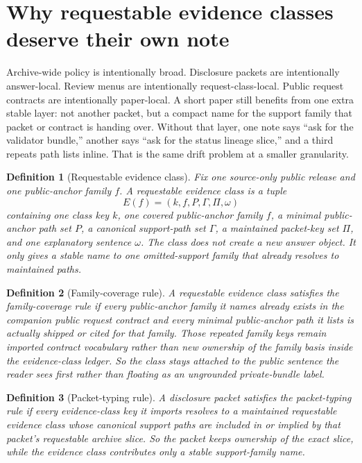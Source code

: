 \documentclass[11pt]{article}
\newtheorem{definition}{Definition}
\begin{document}
\section{Why requestable evidence classes deserve their own note}
Archive-wide policy is intentionally broad.
Disclosure packets are intentionally answer-local.
Review menus are intentionally request-class-local.
Public request contracts are intentionally paper-local.
A short paper still benefits from one extra stable layer: not another packet, but a compact name for the support family that packet or contract is handing over.
Without that layer, one note says ``ask for the validator bundle,'' another says ``ask for the status lineage slice,'' and a third repeats path lists inline.
That is the same drift problem at a smaller granularity.

\begin{definition}[Requestable evidence class]
Fix one source-only public release and one public-anchor family $f$.
A \emph{requestable evidence class} is a tuple
\[
E(f)=(k,f,P,\Gamma,\Pi,\omega)
\]
containing one class key $k$, one covered public-anchor family $f$, a minimal public-anchor path set $P$, a canonical support-path set $\Gamma$, a maintained packet-key set $\Pi$, and one explanatory sentence $\omega$.
The class does not create a new answer object.
It only gives a stable name to one omitted-support family that already resolves to maintained paths.
\end{definition}

\begin{definition}[Family-coverage rule]
A requestable evidence class satisfies the \emph{family-coverage rule} if every public-anchor family it names already exists in the companion public request contract and every minimal public-anchor path it lists is actually shipped or cited for that family. Those repeated family keys remain imported contract vocabulary rather than new ownership of the family basis inside the evidence-class ledger.
So the class stays attached to the public sentence the reader sees first rather than floating as an ungrounded private-bundle label.
\end{definition}

\begin{definition}[Packet-typing rule]
A disclosure packet satisfies the \emph{packet-typing rule} if every evidence-class key it imports resolves to a maintained requestable evidence class whose canonical support paths are included in or implied by that packet's requestable archive slice.
So the packet keeps ownership of the exact slice, while the evidence class contributes only a stable support-family name.
\end{definition}
\end{document}
